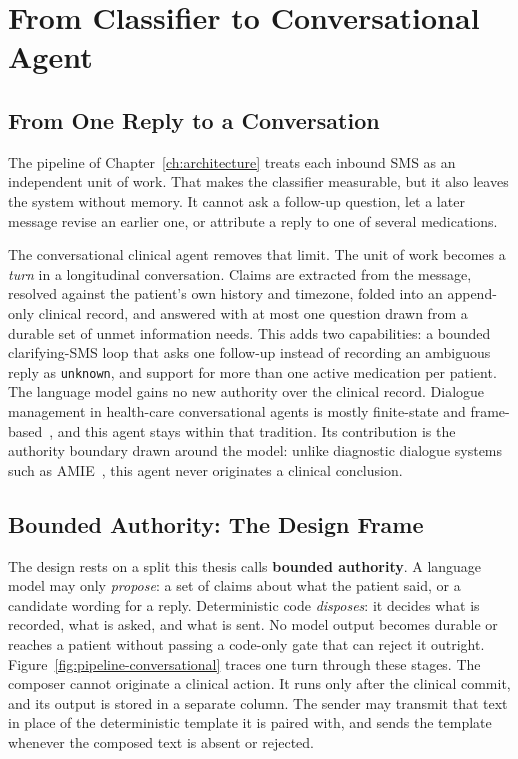 
\chapter{From Classifier to Conversational Agent}
\label{ch:conversational}

\section{From One Reply to a Conversation}
\label{sec:conv-motivation}

The pipeline of Chapter~\ref{ch:architecture} treats each inbound SMS as an
independent unit of work. That makes the classifier measurable, but it also
leaves the system without memory. It cannot ask a follow-up question, let a later
message revise an earlier one, or attribute a reply to one of several
medications.

The conversational clinical agent removes that limit. The unit of work becomes a
\emph{turn} in a longitudinal conversation. Claims are extracted from the
message, resolved against the patient's own history and timezone, folded into an
append-only clinical record, and answered with at most one question drawn from a
durable set of unmet information needs. This adds two capabilities: a bounded
clarifying-SMS loop that asks one follow-up instead of recording an ambiguous
reply as \texttt{unknown}, and support for more than one active medication per
patient. The language model gains no new authority over the clinical record.
Dialogue management in health-care conversational agents is mostly finite-state
and frame-based~\cite{laranjo2018conversational}, and this agent stays within
that tradition. Its contribution is the authority boundary drawn around the
model: unlike diagnostic dialogue systems such as AMIE~\cite{tu2024amie}, this
agent never originates a clinical conclusion.

\section{Bounded Authority: The Design Frame}
\label{sec:conv-bounded}

The design rests on a split this thesis calls \textbf{bounded authority}. A
language model may only \emph{propose}: a set of claims about what the patient
said, or a candidate wording for a reply. Deterministic code \emph{disposes}: it
decides what is recorded, what is asked, and what is sent. No model output
becomes durable or reaches a patient without passing a code-only gate that can
reject it outright. Figure~\ref{fig:pipeline-conversational} traces one turn
through these stages. The composer cannot originate a clinical action. It runs
only after the clinical commit, and its output is stored in a separate column.
The sender may transmit that text in place of the deterministic template it is
paired with, and sends the template whenever the composed text is absent or
rejected.

